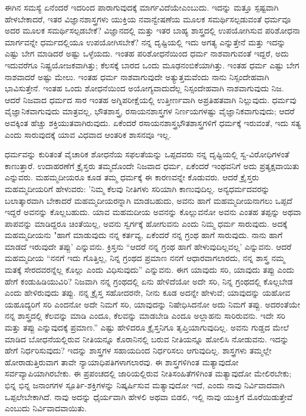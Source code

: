 ಈಗಿನ ಸಮಸ್ಯೆ ಏನೆಂದರೆ ಇದರಿಂದ ಪಾರಾಗುವುದಕ್ಕೆ ಮಾರ್ಗವಿದೆಯೇ\break ಎಂಬುದು. ಇದನ್ನು ಮತ್ತೂ ಸ್ಪಷ್ಟವಾಗಿ ಹೇಳಬೇಕಾದರೆ, ಇತರ ವಿಜ್ಞಾನಶಾಸ್ತ್ರಗಳು ಯುಕ್ತಿಯ ನವಾನ್ವೇಷಣೆಯ ಮೂಲಕ ಸಮರ್ಥಿಸಲ್ಪಡುವಂತೆ ಧರ್ಮವೂ ಅದರ ಮೂಲಕ ಸಮರ್ಥಿಸಲ್ಪಡಬೇಕೆ? ವಿಜ್ಞಾನದಲ್ಲಿ ಮತ್ತು ಇತರ ಬಾಹ್ಯ ಶಾಸ್ತ್ರದಲ್ಲಿ ಉಪಯೋಗಿಸುವ ಪರಿಶೋಧನಾ ಮಾರ್ಗವನ್ನೇ ಧರ್ಮದಲ್ಲಿಯೂ ಉಪಯೋಗಿಸಬೇಕೆ? ನನ್ನ ದೃಷ್ಟಿಯಲ್ಲಿ ಇದು ಅಗತ್ಯ ಎನ್ನುತ್ತೇನೆ ಮತ್ತು ಇದನ್ನು ಎಷ್ಟು ಬೇಗ ಮಾಡಿದರೆ ಅಷ್ಟು ಒಳ್ಳೆಯದು. ಇಂತಹ ಪರಿಶೋಧನೆಯಿಂದ ಧರ್ಮ ನಾಶವಾಗುವಂತೆ ಇದ್ದರೆ, ಅದು ಇದುವರೆಗೂ ನಿಷ್ಪ್ರಯೋಜಕವಾಗಿತ್ತು; ಕೆಲಸಕ್ಕೆ ಬಾರದ ಒಂದು ಮೂಢನಂಬಿಕೆಯಾಗಿತ್ತು. ಇಂತಹ ಧರ್ಮ ಎಷ್ಟು ಬೇಗ ನಾಶವಾದರೆ ಅಷ್ಟು ಮೇಲು. ಇಂತಹ ಧರ್ಮ ನಾಶವಾಗುವುದೇ ಅತ್ಯುತ್ತಮವೆಂದು ನಾನು ನಿಸ್ಸಂದೇಹವಾಗಿ ಭಾವಿಸುತ್ತೇನೆ. ಇಂತಹ ಒಂದು ಶೋಧನೆಯಿಂದ ಅಯೋಗ್ಯವಾದುದೆಲ್ಲ ನಿಸ್ಸಂದೇಹವಾಗಿ ನಾಶವಾಗುವುದು ನಿಜ. ಆದರೆ ನಿಜವಾದ ಧರ್ಮದ ಸಾರ ಇಂತಹ ಅಗ್ನಿಪರೀಕ್ಷೆಯಲ್ಲಿ ಉತ್ತೀರ್ಣವಾಗಿ ಅಪ್ರತಿಹತವಾಗಿ ನಿಲ್ಲುವುದು. ಧರ್ಮವು ವೈಜ್ಞಾನಿಕವಾಗುವುದು ಮಾತ್ರವಲ್ಲ, ಭೌತಶಾಸ್ತ್ರ, ರಸಾಯನಶಾಸ್ತ್ರಗಳ ನಿರ್ಣಯಗಳಷ್ಟು ವೈಜ್ಞಾನಿಕವಾಗುವುದು; ಆದರೆ ಅವಕ್ಕಿಂತ ಹೆಚ್ಚು ಶಕ್ತಿಯುತವಾಗಿರುವುದು. ಏಕೆಂದರೆ ರಸಾಯನಶಾಸ್ತ್ರಭೌತಶಾಸ್ತ್ರಗಳಿಗೆ ಧರ್ಮಕ್ಕೆ ಇರುವಂತೆ, ಇದು ಸತ್ಯ ಎಂದು ಸಾರುವುದಕ್ಕೆ ಯಾವ ವಿಧವಾದ ಆಂತರಿಕ ಶಾಸನವೂ ಇಲ್ಲ.

ಧರ್ಮವನ್ನು ಕುರಿತಂತೆ ವೈಚಾರಿಕ ಶೋಧನೆಯ ಸಫಲತೆಯನ್ನು ಒಪ್ಪದವರು ನನ್ನ ದೃಷ್ಟಿಯಲ್ಲಿ ಸ್ವ-ವಿರೋಧಿಗಳಂತೆ ಕಾಣುತ್ತಾರೆ. ಉದಾಹರಣೆಗೆ ಕ್ರೈಸ್ತರು ತಮ್ಮದೊಂದೇ ನಿಜವಾದ ಧರ್ಮ, ಏಕೆಂದರೆ ಇಂಥವನಿಗೆ ಅದು ಪ್ರತ್ಯಕ್ಷವಾಯಿತು ಎನ್ನುವರು. ಮಹಮ್ಮದೀಯರೂ ಕೂಡ ತಮ್ಮ ಧರ್ಮಕ್ಕೆ ಈ ಕಾರಣವನ್ನೇ ಕೊಡುವರು. ಆದರೆ ಕ್ರೈಸ್ತರು ಮಹಮ್ಮದೀಯರಿಗೆ ಹೇಳುವರು: 'ನಿಮ್ಮ ಕೆಲವು ನೀತಿಗಳು ಸರಿಯಾಗಿ ಕಾಣುವುದಿಲ್ಲ. ಅನ್ಯಧರ್ಮದವರನ್ನು ಬಲಾತ್ಕಾರವಾಗಿ ಬೇಕಾದರೆ ಮಹಮ್ಮದೀಯರನ್ನಾಗಿ ಮಾಡಬಹುದು, ಅವನು ಹಾಗೆ ಮಹಮ್ಮದೀಯನಾಗಲು ಒಪ್ಪದೆ ಇದ್ದರೆ ಅವನನ್ನು ಕೊಲ್ಲಬಹುದು. ಯಾವ ಮಹಮದೀಯ ಅವನನ್ನು ಕೊಲ್ಲುವನೋ ಅವನು ಎಂತಹ ತಪ್ಪನ್ನು ಅಥವಾ ಪಾಪವನ್ನು ಮಾಡಿದ್ದರೂ ಚಿಂತೆಯಿಲ್ಲ, ಅವನು ಸ್ವರ್ಗಕ್ಕೆ ಹೋಗುವನು ಎಂದು ನಿಮ್ಮ ಧರ್ಮ ಸಾರುವುದು. ಅದಕ್ಕೆ ಮಹಮ್ಮದೀಯನು "ಹಾಗೆ ಮಾಡುವುದು ನನ್ನ ಕರ್ತವ್ಯ, ಏಕೆಂದರೆ ನನ್ನ ಗ್ರಂಥ ಹಾಗೆ ಸಾರುವುದು. ನಾನು ಹಾಗೆ ಮಾಡದೆ ಇರುವುದೇ ತಪ್ಪು' ಎನ್ನುವನು. ಕ್ರಿಸ್ತನು “ಆದರೆ ನನ್ನ ಗ್ರಂಥ ಹಾಗೆ ಹೇಳುವುದಿಲ್ಲವಲ್ಲ' ಎನ್ನುವನು. ಆದರೆ ಮಹಮ್ಮದೀಯ “ನನಗೆ ಇದು ಗೊತ್ತಿಲ್ಲ, ನಿನ್ನ ಗ್ರಂಥದ ಪ್ರಮಾಣ ನನಗೆ ಆಧಾರವಾಗಲಾರದು, ನನ್ನ ಶಾಸ್ತ್ರ ನಮ್ಮ ಮತಕ್ಕೆ ಸೇರದವರನ್ನೆಲ್ಲ ಕೊಲ್ಲು ಎಂದು ವಿಧಿಸುವುದು'' ಎನ್ನುವನು. ಈಗ ಯಾವುದು ಸರಿ, ಯಾವುದು ತಪ್ಪು ಎಂದು ಹೇಗೆ ಕಂಡುಹಿಡಿಯುವಿರಿ? ನಿಜವಾಗಿ ನನ್ನ ಗ್ರಂಥದಲ್ಲಿ ಏನು ಹೇಳಿದೆಯೋ ಅದೇ ಸರಿ, ನಿನ್ನ ಗ್ರಂಥದಲ್ಲಿ ಕೊಲ್ಲಬೇಡ ಎಂದು ಹೇಳಿರುವುದು ತಪ್ಪು. ನನ್ನ ಕ್ರೈಸ್ತ ಸಹೋದರನೇ, ನೀನು ಕೂಡ ಅದನ್ನೇ ಹೇಳುವೆ; ಯಾವುದನ್ನು ಯಹೋವ ಯಹೂದ್ಯರಿಗೆ ಸರಿ ಎಂದನೋ ಅದೇ ನಿಮಗೆ ಸರಿ, ಯಾವುದನ್ನು ನಿಷೇಧಿಸಿದನೋ ಅದು ನಿಮಗೆ ತಪ್ಪು. ಅದರಂತೆಯೇ ನನ್ನ ಶಾಸ್ತ್ರದಲ್ಲಿ ಕೆಲವನ್ನು ಮಾಡಿ ಎಂದೂ, ಕೆಲವನ್ನು ಮಾಡಬೇಡಿ ಎಂದೂ ಅಲ್ಲಾಹನು ಸಾರಿರುವನು. ಇದೇ ಸರಿ ಮತ್ತು ತಪ್ಪು ಎನ್ನುವುದಕ್ಕೆ ಪ್ರಮಾಣ.” ಎಷ್ಟು ಹೇಳಿದರೂ ಕ್ರೈಸ್ತನಿಗೂ ತೃಪ್ತಿಯಾಗುವುದಿಲ್ಲ. ಅವನು ಗುಡ್ಡದ ಮೇಲೆ ಮಾಡಿದ ಬೋಧನೆಯಲ್ಲಿರುವ ನೀತಿಯನ್ನೂ ಕೊರಾನಿನಲ್ಲಿ ಬರುವ ನೀತಿಯನ್ನೂ ಹೋಲಿಸಿ ನೋಡುವನು. ಇದನ್ನು ಹೇಗೆ ನಿರ್ಧರಿಸುವುದು? ಇದನ್ನು ಶಾಸ್ತ್ರಗಳ ಸಹಾಯದಿಂದ ನಿರ್ಧರಿಸಲು ಆಗುವುದಿಲ್ಲ. ಶಾಸ್ತ್ರಗಳು ತಮ್ಮಲ್ಲೇ ಹೋರಾಡುತ್ತಿರುವಾಗ ತಾವೇ ನ್ಯಾಯಾಧಿಪತಿಗಳಾಗಲಾರವು. ಈ ಶಾಸ್ತ್ರಗಳಿಗಿಂತ ಮತ್ಯಾವುದೋ ಸರ್ವವ್ಯಾಪಿಯಾಗಿರಬೇಕು. ಈ ಪ್ರಪಂಚದಲ್ಲಿ ಜಾರಿಯಲ್ಲಿರುವ ನೀತಿಸಂಹಿತೆಗಳಿಗಿಂತ ಮತ್ಯಾವುದೋ ಮೇಲಿರಬೇಕು; ಭಿನ್ನ ಭಿನ್ನ ಜನಾಂಗಗಳ ಸ್ಪೂರ್ತಿ-ಶಕ್ತಿಗಳನ್ನು ನಿಷ್ಕರ್ಷಿಸುವ ಮತ್ಯಾವುದೋ ಇದೆ, ಎಂದು ನಾವು ನಿರ್ವಿವಾದವಾಗಿ ಒಪ್ಪಲೇಬೇಕಾಗಿದೆ. ನಾವು ಅದನ್ನು ಧೈರ್ಯವಾಗಿ ಹೇಳಲಿ ಅಥವಾ ಬಿಡಲಿ, ಇಲ್ಲಿ ನಾವು ಯುಕ್ತಿಗೆ ಮೊರೆಯಿಡುತ್ತೇವೆ ಎಂಬುದು ನಿರ್ವಿವಾದವಾಯಿತು.

